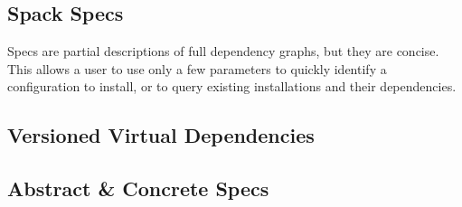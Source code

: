 \subsection{Spack Specs}\label{sec:specs}

  Specs are partial descriptions of full
dependency graphs, but they are concise.  This allows a user to use
only a few parameters to quickly identify a configuration to install,
or to query existing installations and their dependencies.






\subsection{Versioned Virtual Dependencies}

\subsection{Abstract \& Concrete Specs}
	

